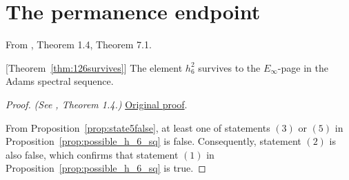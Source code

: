\section{The permanence endpoint}

\begin{theorem}[Permanence of $h_6^2$]
\label{paper:1.4}
\label{paper:7.1}
\label{thm:126survives}
From \cite{LWX126}, Theorem 1.4, Theorem 7.1.\par
[Theorem~\ref{thm:126survives}] \label{thm:h_6_sq}\label{thm:h62}
    The element $h_6^2$ survives to the $E_\infty$-page in the Adams spectral sequence.


\end{theorem}
\begin{proof}
\textit{(See \cite{LWX126}, Theorem 1.4.)} \href{paper/main.tex.html#L2212}{Original proof}.

From Proposition~\ref{prop:state5false}, at least one of  statements $(3)$ or $(5)$ in Proposition~\ref{prop:possible_h_6_sq} is false. Consequently,  statement $(2)$ is also false, which confirms that statement $(1)$ in Proposition~\ref{prop:possible_h_6_sq} is true.
\end{proof}

